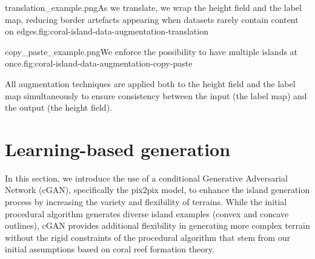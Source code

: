 \begin{Itemize}
    {translation_example.png}{As we translate, we wrap the height field and the label map, reducing border artefacts appearing when datasets rarely contain content on edges.}{fig:coral-island-data-augmentation-translation}

    {copy_paste_example.png}{We enforce the possibility to have multiple islands at once.}{fig:coral-island-data-augmentation-copy-paste}


\end{Itemize}

All augmentation techniques are applied both to the height field and the label map simultaneously to ensure consistency between the input (the label map) and the output (the height field).

\section{Learning-based generation}
\label{sec:coral-island-cGAN-training}

In this section, we introduce the use of a conditional Generative Adversarial Network (cGAN), specifically the pix2pix model, to enhance the island generation process by increasing the variety and flexibility of terrains. While the initial procedural algorithm generates diverse island examples (convex and concave outlines), cGAN provides additional flexibility in generating more complex terrain without the rigid constraints of the procedural algorithm that stem from our initial assumptions based on coral reef formation theory.

